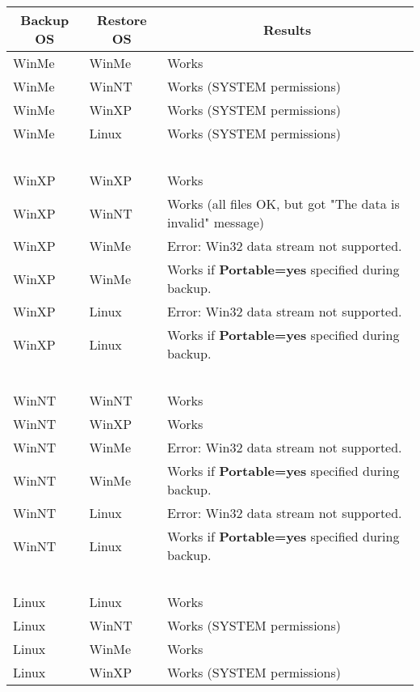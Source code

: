 \begin{longtable}{|l|l|p{2.8in}|}
 \hline 
\multicolumn{1}{|c|}{\bf Backup OS} & \multicolumn{1}{c|}{\bf Restore OS}
& \multicolumn{1}{c|}{\bf Results } \\
 \hline {WinMe} & {WinMe} & {Works } \\
 \hline {WinMe} & {WinNT} & {Works (SYSTEM permissions) } \\
 \hline {WinMe} & {WinXP} & {Works (SYSTEM permissions) } \\
 \hline {WinMe} & {Linux} & {Works (SYSTEM permissions) } \\
 \hline {\ } & {\ } & {\ } \\
 \hline {WinXP} & {WinXP} & {Works } \\
 \hline {WinXP} & {WinNT} & {Works (all files OK, but got "The data is invalid"
message) } \\
 \hline {WinXP} & {WinMe} & {Error: Win32 data stream not supported. } \\
 \hline {WinXP} & {WinMe} & {Works if {\bf Portable=yes} specified during backup.} \\
 \hline {WinXP} & {Linux} & {Error: Win32 data stream not supported. } \\
 \hline {WinXP} & {Linux} & {Works if {\bf Portable=yes} specified during backup.}\\
 \hline {\ } & {\ } & {\ } \\
 \hline {WinNT} & {WinNT} & {Works } \\
 \hline {WinNT} & {WinXP} & {Works } \\
 \hline {WinNT} & {WinMe} & {Error: Win32 data stream not supported. } \\
 \hline {WinNT} & {WinMe} & {Works if {\bf Portable=yes} specified during backup.}\\
 \hline {WinNT} & {Linux} & {Error: Win32 data stream not supported. } \\
 \hline {WinNT} & {Linux} & {Works if {\bf Portable=yes} specified during backup. }\\
 \hline {\ } & {\ } & {\ } \\
 \hline {Linux} & {Linux} & {Works } \\
 \hline {Linux} & {WinNT} & {Works (SYSTEM permissions) } \\
 \hline {Linux} & {WinMe} & {Works } \\
 \hline {Linux} & {WinXP} & {Works (SYSTEM permissions)}
\\ \hline 
\end{longtable}


